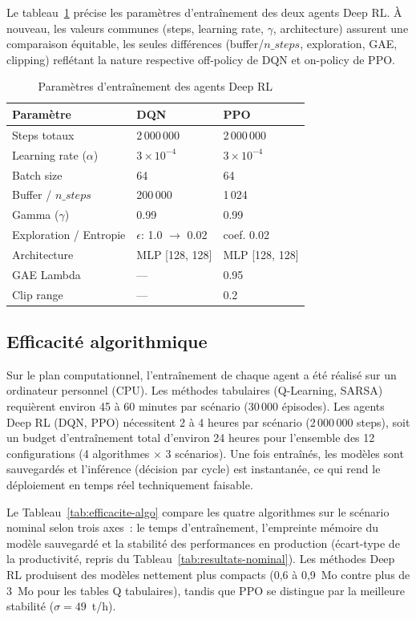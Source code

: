 \documentclass[11pt,a4paper]{report}
\begin{document}
Le tableau~\ref{tab:params-deeprl} pr\'ecise les param\`etres d'entra\^inement des deux agents Deep RL. \`A nouveau, les valeurs communes (steps, learning rate, $\gamma$, architecture) assurent une comparaison \'equitable, les seules diff\'erences (buffer/$n\_steps$, exploration, GAE, clipping) refl\'etant la nature respective off-policy de DQN et on-policy de PPO.

\begin{table}[H]
\centering
\caption{Paramètres d'entraînement des agents Deep RL}
\label{tab:params-deeprl}
\begin{tabular}{lll}
\toprule
\textbf{Paramètre} & \textbf{DQN} & \textbf{PPO} \\
\midrule
Steps totaux & 2\,000\,000 & 2\,000\,000 \\
Learning rate ($\alpha$) & $3 \times 10^{-4}$ & $3 \times 10^{-4}$ \\
Batch size & 64 & 64 \\
Buffer / $n\_steps$ & 200\,000 & 1\,024 \\
Gamma ($\gamma$) & 0.99 & 0.99 \\
Exploration / Entropie & $\epsilon$: 1.0 $\to$ 0.02 & coef. 0.02 \\
Architecture & MLP [128, 128] & MLP [128, 128] \\
GAE Lambda & — & 0.95 \\
Clip range & — & 0.2 \\
\bottomrule
\end{tabular}
\end{table}

\subsection{Efficacité algorithmique}

Sur le plan computationnel, l'entraînement de chaque agent a été
réalisé sur un ordinateur personnel (CPU). Les méthodes tabulaires
(Q-Learning, SARSA) requièrent environ 45 à 60 minutes par scénario
(30\,000 épisodes). Les agents Deep RL (DQN, PPO) nécessitent 2 à 4
heures par scénario (2\,000\,000 steps), soit un budget d'entraînement
total d'environ 24 heures pour l'ensemble des 12 configurations
(4 algorithmes $\times$ 3 scénarios). Une fois entraînés, les modèles
sont sauvegardés et l'inférence (décision par cycle) est instantanée,
ce qui rend le déploiement en temps réel techniquement faisable.

Le Tableau~\ref{tab:efficacite-algo} compare les quatre algorithmes
sur le scénario nominal selon trois axes~: le temps d'entraînement,
l'empreinte mémoire du modèle sauvegardé et la stabilité des
performances en production (écart-type de la productivité, repris du
Tableau~\ref{tab:resultats-nominal}).  Les méthodes Deep RL produisent
des modèles nettement plus compacts (0,6 à 0,9~Mo contre plus de 3~Mo
pour les tables Q tabulaires), tandis que PPO se distingue par la
meilleure stabilité ($\sigma = 49$~t/h).
\end{document}

